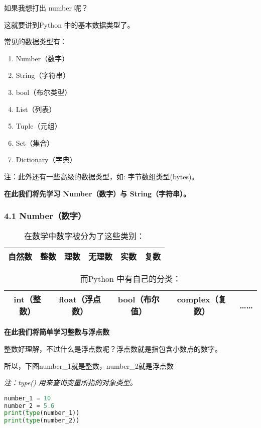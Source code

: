 如果我想打出 number 呢？

这就要讲到Python 中的基本数据类型了。

常见的数据类型有：

\begin{enumerate}
\item Number（数字）
\item String（字符串）
\item bool（布尔类型）
\item List（列表）
\item Tuple（元组）
\item Set（集合）
\item Dictionary（字典）
\end{enumerate}

注：此外还有一些高级的数据类型，如: 字节数组类型(bytes)。

\textbf{在此我们将先学习 Number（数字）与 String（字符串）。}

\subsubsection{4.1 Number（数字）}

\begin{table}[ht]
\centering
\caption{在数学中数字被分为了这些类别：}\label{tab_Pyc21}
\begin{tabular}{|c|c|c|c|c|c|}
\hline
自然数&整数&理数&无理数&实数&复数\\
\hline
\end{tabular}
\end{table}

\begin{table}[ht]
\centering
\caption{而Python 中有自己的分类：}\label{tab_Pyc22}
\begin{tabular}{|c|c|c|c|c|}
\hline
int（整数）&float（浮点数）&bool（布尔值）&complex（复数）&…… \\
\hline
\end{tabular}
\end{table}


\textbf{在此我们将简单学习整数与浮点数}

整数好理解，不过什么是浮点数呢？浮点数就是指包含小数点的数字。

所以，下图number_1就是整数，number_2就是浮点数

\textsl{注：type() 用来查询变量所指的对象类型。}

\begin{lstlisting}[language=python]
number_1 = 10 
number_2 = 5.6
print(type(number_1))
print(type(number_2))
\end{lstlisting}

